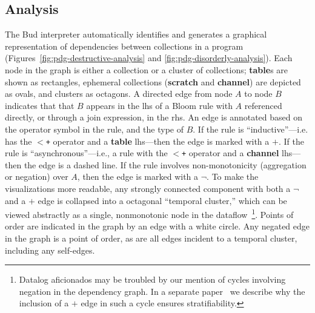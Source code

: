 \subsection{Analysis}

The Bud interpreter automatically identifies and generates a graphical
representation of dependencies between collections in a program
(Figures~\ref{fig:pdg-destructive-analysis} and \ref{fig:pdg-disorderly-analysis}).
Each node in the graph is either a collection or a cluster of collections; \textbf{table}s are shown as rectangles, ephemeral
collections (\textbf{scratch} and \textbf{channel}) are depicted as ovals, and clusters as octagons.  A
directed edge from node $A$ to node $B$ indicates that that $B$ appears in the
lhs of a Bloom rule with $A$ referenced directly, or through a join expression,
in the rhs.  An edge is annotated based on the operator symbol in the rule, and
the type of $B$.  If the rule is ``inductive''---i.e. has the \texttt{$<$+}
operator and a {\bf table} lhs---then the edge is marked with a $+$.  If the
rule is ``asynchronous''---i.e., a rule with the \texttt{$<$+} operator and a {\bf
channel} lhs---then the edge is a dashed line.  If the rule involves
non-monotonicity (aggregation or negation) over $A$, then the edge is marked with a $\lnot$.
To make the visualizations more readable, any strongly connected component with both a $\lnot$ and a $+$ edge is collapsed into a octagonal ``temporal cluster,'' 
which can be viewed abstractly as a single, nonmonotonic node in the 
dataflow~\footnote{Datalog aficionados may be troubled by our mention of cycles
involving negation in the dependency graph.  In a separate paper~\cite{dedalus-techr} we
describe why the inclusion of a $+$ edge in such a cycle ensures stratifiability.}.
Points of order are indicated in the graph by an edge with a white circle.
 Any negated edge in the graph is a point of order, as are all edges incident to a temporal cluster, including any self-edges.


